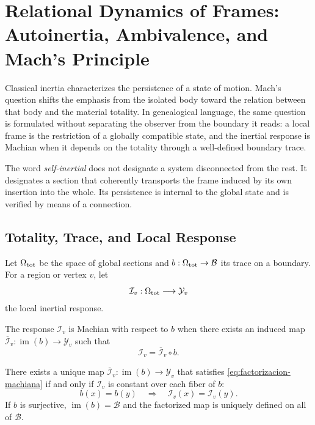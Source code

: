 \chapter{Relational Dynamics of Frames: Autoinertia, Ambivalence, and Mach's Principle}
\label{chap:autoinercia-mach}

Classical inertia characterizes the persistence of a state of motion.
Mach's question \cite{MachMechanics} shifts the emphasis from the isolated body toward the
relation between that body and the material totality. In genealogical
language, the same question is formulated without separating the observer from the
boundary it reads: a local frame is the restriction of a globally compatible
state, and the inertial response is Machian when it depends on the totality through
a well-defined boundary trace.

The word \emph{self-inertial} does not designate a system disconnected from the rest.
It designates a section that coherently transports the frame induced by its
own insertion into the whole. Its persistence is internal to the global state
and is verified by means of a connection.

\section{Totality, Trace, and Local Response}

Let \(\Omega_{\rm tot}\) be the space of global sections and
\(b:\Omega_{\rm tot}\to\mathcal B\) its trace on a boundary. For a
region or vertex \(v\), let
\[
 \mathcal I_v:\Omega_{\rm tot}\longrightarrow\mathcal Y_v
\]
the local inertial response.

\begin{definition}
The response \(\mathcal I_v\) is Machian with respect to \(b\) when there exists
an induced map
\(\overline{\mathcal I}_v:\operatorname{im}(b)\to\mathcal Y_v\) such that
\begin{equation}
 \mathcal I_v=\overline{\mathcal I}_v\circ b.
 \label{eq:factorizacion-machiana}
\end{equation}
\end{definition}

\begin{theorem}
\label{thm:criterio-mach}
There exists a unique map
\(\overline{\mathcal I}_v:\operatorname{im}(b)\to\mathcal Y_v\) that satisfies
\eqref{eq:factorizacion-machiana} if and only if \(\mathcal I_v\) is constant
over each fiber of \(b\):
\[
 b(x)=b(y)\quad\Longrightarrow\quad
 \mathcal I_v(x)=\mathcal I_v(y).
\]
If \(b\) is surjective, \(\operatorname{im}(b)=\mathcal B\) and the factorized
map is uniquely defined on all of \(\mathcal B\).
\end{theorem}

